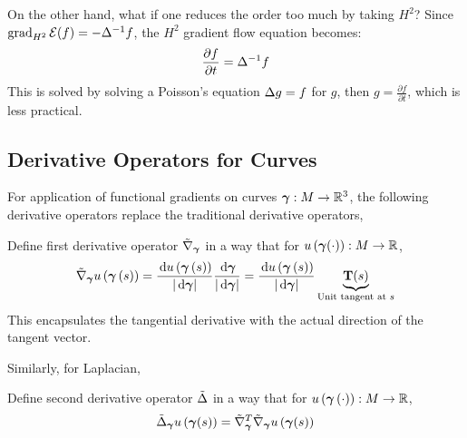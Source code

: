 \documentclass[../dissertation.tex]{subfiles}
\begin{document}
\begin{example}
    On the other hand, what if one reduces the order too much by taking $H^2$?
    Since $\operatorname{grad}_{H^2} \mathcal{E} (f) = -\Delta^{-1} f$, the $H^2$ gradient flow equation becomes:
    \begin{equation}
        \frac{\partial f}{\partial t} = \Delta^{-1} f
    \end{equation}
    This is solved by solving a Poisson's equation $\Delta g = f$ for $g$,
    then $g = \frac{\partial f}{\partial t}$,
    which is less practical.
\end{example}

\subsection{Derivative Operators for Curves}
For application of functional gradients on curves $\boldsymbol{\gamma}: M \rightarrow \mathbb{R}^3$,
the following derivative operators replace the traditional derivative operators,
\begin{definition}
    Define first derivative operator\cite{YSC2021} $\tilde{\nabla}_{\boldsymbol{\gamma}}$ in a way that for $u \left( \boldsymbol{\gamma} (\cdot) \right): M \rightarrow \mathbb{R}$,
    \begin{equation}
        \tilde{\nabla}_{\boldsymbol{\gamma}} u \left( \boldsymbol{\gamma} \left( s \right) \right)
        = \frac{\, \text{d} u \left( \boldsymbol{\gamma} \left( s \right) \right)}{\left| \, \text{d} \boldsymbol{\gamma} \right|} \frac{\, \text{d} \boldsymbol{\gamma}}{\left| \, \text{d} \boldsymbol{\gamma} \right|}
        = \frac{\, \text{d} u \left( \boldsymbol{\gamma} \left( s \right) \right)}{\left| \, \text{d} \boldsymbol{\gamma} \right|} \underbrace{\mathbf{T}(s)}_{\text{Unit tangent at } s}
        \label{equ: Curve Gradient Operator}
    \end{equation}
    This encapsulates the tangential derivative with the actual direction of the tangent vector.
\end{definition}

Similarly, for Laplacian,
\begin{definition}
    Define second derivative operator $\tilde{\Delta}$ in a way that for $u \left( \boldsymbol{\gamma} \left( \cdot \right) \right): M \rightarrow \mathbb{R}$,
    \begin{equation}
        \tilde{\Delta}_{\boldsymbol{\gamma}} u \left( \boldsymbol{\gamma} (s) \right) = \tilde{\nabla}_{\boldsymbol{\gamma}}^{T} \tilde{\nabla}_{\boldsymbol{\gamma}} u \left( \boldsymbol{\gamma} (s) \right)
    \end{equation}
\end{definition}
\end{document}
